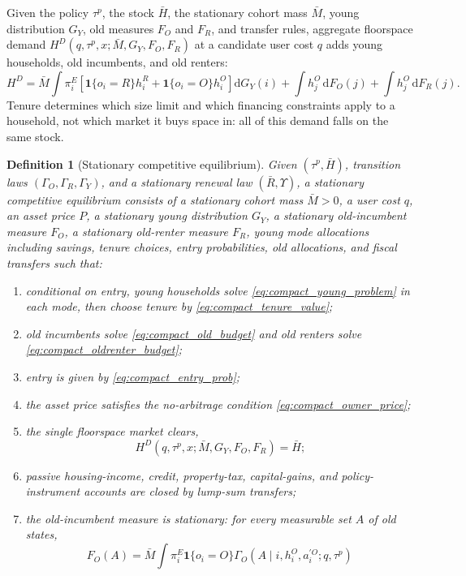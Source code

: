 \documentclass[11pt]{article}
\newtheorem{definition}{Definition}
\newcommand{\dd}{\mathrm d}
\newcommand{\1}{\mathbf 1}
\begin{document}
Given the policy $\tau^p$, the stock $\bar H$, the stationary cohort mass $\bar M$, young distribution $G_Y$, old measures $F_O$ and $F_R$, and transfer rules, aggregate floorspace demand $H^{D}(q,\tau^p,x;\bar M,G_Y,F_O,F_R)$ at a candidate user cost $q$ adds young households, old incumbents, and old renters:
\[
H^{D}
=
\bar M\int \pi_i^E
\left[
\1\{o_i=R\}h_i^R+\1\{o_i=O\}h_i^O
\right]\dd G_Y(i)
+
\int h_j^O\,\dd F_O(j)
+
\int h_j^O\,\dd F_R(j).
\]
Tenure determines which size limit and which financing constraints apply to a household, not which market it buys space in: all of this demand falls on the same stock.

\begin{definition}[Stationary competitive equilibrium]
Given $(\tau^p,\bar H)$, transition laws $(\Gamma_O,\Gamma_R,\Gamma_Y)$, and a stationary renewal law $(\bar R,\Upsilon)$, a stationary competitive equilibrium consists of a stationary cohort mass $\bar M>0$, a user cost $q$, an asset price $P$, a stationary young distribution $G_Y$, a stationary old-incumbent measure $F_O$, a stationary old-renter measure $F_R$, young mode allocations including savings, tenure choices, entry probabilities, old allocations, and fiscal transfers such that:
\begin{enumerate}
\item conditional on entry, young households solve \eqref{eq:compact_young_problem} in each mode, then choose tenure by \eqref{eq:compact_tenure_value};
\item old incumbents solve \eqref{eq:compact_old_budget} and old renters solve \eqref{eq:compact_oldrenter_budget};
\item entry is given by \eqref{eq:compact_entry_prob};
\item the asset price satisfies the no-arbitrage condition \eqref{eq:compact_owner_price};
\item the single floorspace market clears,
\begin{equation}
H^{D}(q,\tau^p,x;\bar M,G_Y,F_O,F_R)=\bar H;
\label{eq:compact_floorspace_clearing}
\end{equation}
\item passive housing-income, credit, property-tax, capital-gains, and policy-instrument accounts are closed by lump-sum transfers;
\item the old-incumbent measure is stationary: for every measurable set $A$ of old states,
\begin{equation}
F_O(A)
=
\bar M\int
\pi_i^E\1\{o_i=O\}
\Gamma_O(A\mid i,h_i^O,a_i^{\prime O};q,\tau^p)\,

\end{equation}
\end{enumerate}
\end{definition}
\end{document}
